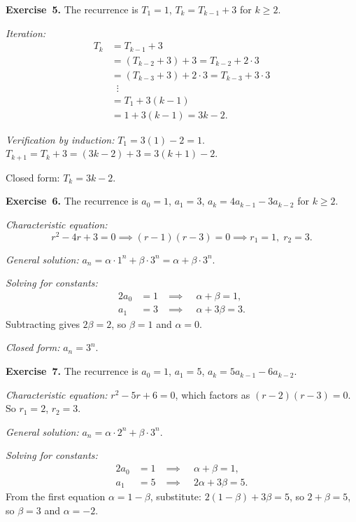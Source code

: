 \documentclass[11pt]{article}
\begin{document}
\medskip
\textbf{Exercise~5.}
The recurrence is $T_1 = 1$, $T_k = T_{k-1} + 3$ for $k \geq 2$.

\emph{Iteration:}
\begin{align*}
  T_k &= T_{k-1} + 3 \\
      &= (T_{k-2} + 3) + 3 = T_{k-2} + 2 \cdot 3 \\
      &= (T_{k-3} + 3) + 2 \cdot 3 = T_{k-3} + 3 \cdot 3 \\
      &\;\;\vdots \\
      &= T_1 + 3(k - 1) \\
      &= 1 + 3(k - 1) = 3k - 2.
\end{align*}

\emph{Verification by induction:}
$T_1 = 3(1) - 2 = 1$. \checkmark
$T_{k+1} = T_k + 3 = (3k - 2) + 3 = 3(k+1) - 2$. \checkmark

Closed form: $T_k = 3k - 2$.

\medskip
\textbf{Exercise~6.}
The recurrence is $a_0 = 1$, $a_1 = 3$,
$a_k = 4 a_{k-1} - 3 a_{k-2}$ for $k \geq 2$.

\emph{Characteristic equation:}
\[
  r^2 - 4r + 3 = 0 \implies (r - 1)(r - 3) = 0 \implies r_1 = 1,\; r_2 = 3.
\]

\emph{General solution:} $a_n = \alpha \cdot 1^n + \beta \cdot 3^n = \alpha + \beta \cdot 3^n$.

\emph{Solving for constants:}
\begin{alignat*}{2}
  a_0 &= 1 &\;\implies\;\; & \alpha + \beta = 1, \\
  a_1 &= 3 &\;\implies\;\; & \alpha + 3\beta = 3.
\end{alignat*}
Subtracting gives $2\beta = 2$, so $\beta = 1$ and $\alpha = 0$.

\emph{Closed form:} $a_n = 3^n$.

\medskip
\textbf{Exercise~7.}
The recurrence is $a_0 = 1$, $a_1 = 5$, $a_k = 5 a_{k-1} - 6 a_{k-2}$.

\emph{Characteristic equation:} $r^2 - 5r + 6 = 0$, which factors as $(r - 2)(r - 3) = 0$. So $r_1 = 2$, $r_2 = 3$.

\emph{General solution:} $a_n = \alpha \cdot 2^n + \beta \cdot 3^n$.

\emph{Solving for constants:}
\begin{alignat*}{2}
  a_0 &= 1 &\;\implies\;\; & \alpha + \beta = 1, \\
  a_1 &= 5 &\;\implies\;\; & 2\alpha + 3\beta = 5.
\end{alignat*}
From the first equation $\alpha = 1 - \beta$, substitute: $2(1 - \beta) + 3\beta = 5$, so $2 + \beta = 5$, so $\beta = 3$ and $\alpha = -2$.
\end{document}
